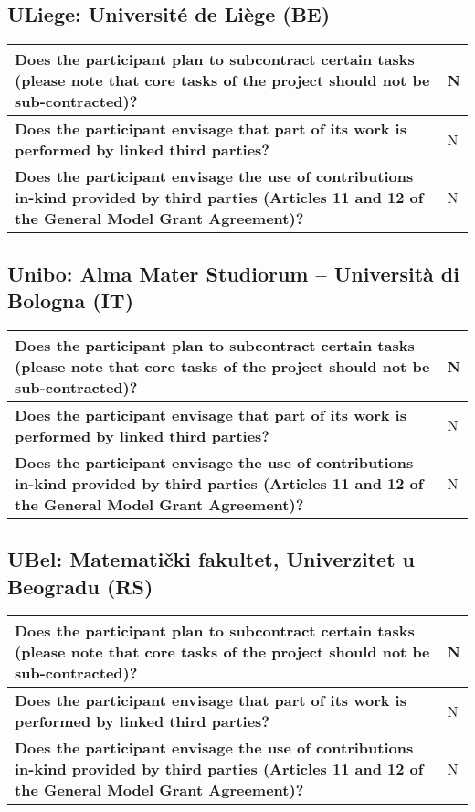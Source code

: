 \subsection*{ULiege: Université de Liège (BE)}

\begin{longtable*}{|p{0.75\textwidth}|p{0.2\textwidth}|}
\hline
{\bf Does the participant plan to subcontract certain tasks (please
  note that core tasks of the project should not be sub-contracted)?}
&
N
\\
\hline
{\bf Does the participant envisage that  part of its work is performed
  by linked third parties?}
&
N
\\
\hline
{\bf Does the participant envisage the use of contributions in-kind
provided by third parties (Articles 11 and 12 of the General Model
Grant Agreement)?}
&
N
\\
\hline
\end{longtable*}

\subsection*{Unibo: Alma Mater Studiorum – Università di Bologna (IT)}

\begin{longtable*}{|p{0.75\textwidth}|p{0.2\textwidth}|}
\hline
{\bf Does the participant plan to subcontract certain tasks (please
  note that core tasks of the project should not be sub-contracted)?}
&
N
\\
\hline
{\bf Does the participant envisage that  part of its work is performed
  by linked third parties?}
&
N
\\
\hline
{\bf Does the participant envisage the use of contributions in-kind
provided by third parties (Articles 11 and 12 of the General Model
Grant Agreement)?}
&
N
\\
\hline
\end{longtable*}

\subsection*{UBel: Matematički fakultet, Univerzitet u Beogradu (RS)}

\begin{longtable*}{|p{0.75\textwidth}|p{0.2\textwidth}|}
\hline
{\bf Does the participant plan to subcontract certain tasks (please
  note that core tasks of the project should not be sub-contracted)?}
&
N
\\
\hline
{\bf Does the participant envisage that  part of its work is performed
  by linked third parties?}
&
N
\\
\hline
{\bf Does the participant envisage the use of contributions in-kind
provided by third parties (Articles 11 and 12 of the General Model
Grant Agreement)?}
&
N
\\
\hline
\end{longtable*}

